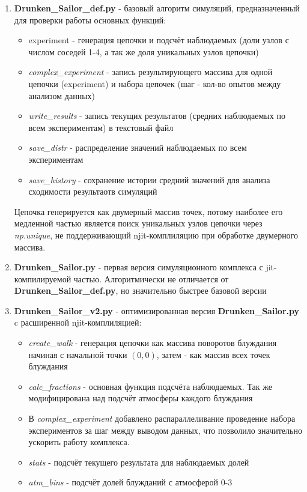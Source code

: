 \begin{enumerate}
\item \textbf{Drunken\_Sailor\_def.py} - базовый алгоритм симуляций, предназначенный для проверки работы основных функций: 
\begin{itemize}
\item experiment - генерация цепочки и подсчёт наблюдаемых (доли узлов с числом соседей 1-4, а так же доля уникальных узлов цепочки)
\item \textit{complex\_experiment} - запись результирующего массива для одной цепочки (experiment) и набора цепочек (шаг - кол-во опытов между анализом данных)
\item \textit{write\_results} - запись текущих результатов (средних наблюдаемых по всем экспериментам) в текстовый файл
\item \textit{save\_distr} - распределение значений наблюдаемых по всем экспериментам
\item \textit{save\_history} - сохранение истории средний значений для анализа сходимости результаотв симуляций
\end{itemize}
Цепочка генерируется как двумерный массив точек, потому наиболее его медленной частью является поиск уникальных узлов цепочки через \textit{np.unique}, не поддерживающий njit-комплиляцию при обработке двумерного массива.
\item \textbf{Drunken\_Sailor.py} - первая версия симуляционного комплекса с jit-компилируемой частью. Алгоритмически не отличается от \textbf{Drunken\_Sailor\_def.py}, но значительно быстрее базовой версии
\item \textbf{Drunken\_Sailor\_v2.py} - оптимизированная версия \textbf{Drunken\_Sailor.py} c расширенной njit-комплиляцией:
\begin{itemize} 
\item \textit{create\_walk} - генерация цепочки как массива поворотов блуждания начиная с начальной точки $(0,0)$, затем - как массив всех точек блуждания
\item \textit{calc\_fractions} - основная функция подсчёта наблюдаемых. Так же модифицирована над подсчёт атмосферы каждого блуждания
\item В \textit{complex\_experiment} добавлено распараллеливание проведение набора экспериментов за шаг между выводом данных, что позволило значительно ускорить работу комплекса.
\item \textit{stats} - подсчёт текущего результата для наблюдаемых долей
\item \textit{atm\_bins} - подсчёт долей блужданий с атмосферой 0-3
\end{itemize}
\end{enumerate}
